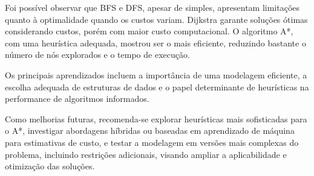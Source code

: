 \documentclass[12pt,a4paper]{article}
\begin{document}
Foi possível observar que BFS e DFS, apesar de simples, apresentam limitações quanto à optimalidade quando os custos variam. Dijkstra garante soluções ótimas considerando custos, porém com maior custo computacional. O algoritmo A*, com uma heurística adequada, mostrou ser o mais eficiente, reduzindo bastante o número de nós explorados e o tempo de execução.  

Os principais aprendizados incluem a importância de uma modelagem eficiente, a escolha adequada de estruturas de dados e o papel determinante de heurísticas na performance de algoritmos informados.  

Como melhorias futuras, recomenda-se explorar heurísticas mais sofisticadas para o A*, investigar abordagens híbridas ou baseadas em aprendizado de máquina para estimativas de custo, e testar a modelagem em versões mais complexas do problema, incluindo restrições adicionais, visando ampliar a aplicabilidade e otimização das soluções.

\clearpage
{}


\end{document}
